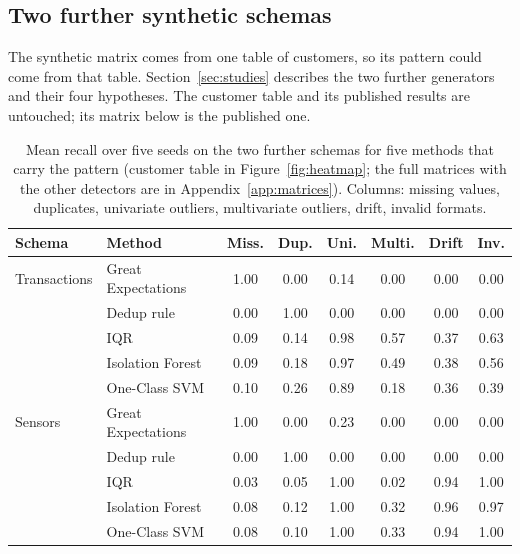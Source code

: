 \documentclass[conference]{IEEEtran}
\begin{document}
\subsection{Two further synthetic schemas}
\label{sec:schemas}
The synthetic matrix comes from one table of customers, so its pattern could
come from that table. Section~\ref{sec:studies} describes the two further generators and
their four hypotheses. The customer table and its published results are untouched; its
matrix below is the published one.

\begin{table}[t]
\caption{Mean recall over five seeds on the two further schemas for five
methods that carry the pattern (customer table in
Figure~\ref{fig:heatmap}; the full matrices with the other detectors are in
Appendix~\ref{app:matrices}). Columns: missing values, duplicates, univariate
outliers, multivariate outliers, drift, invalid formats.}
\label{tab:schemas}
\centering
\footnotesize
\setlength{\tabcolsep}{2.5pt}
\begin{tabular}{llcccccc}
\toprule
Schema & Method & Miss. & Dup. & Uni. & Multi. & Drift & Inv. \\
\midrule
Transactions & Great Expectations & 1.00 & 0.00 & 0.14 & 0.00 & 0.00 & 0.00 \\
             & Dedup rule         & 0.00 & 1.00 & 0.00 & 0.00 & 0.00 & 0.00 \\
             & IQR                & 0.09 & 0.14 & 0.98 & 0.57 & 0.37 & 0.63 \\
             & Isolation Forest   & 0.09 & 0.18 & 0.97 & 0.49 & 0.38 & 0.56 \\
             & One-Class SVM      & 0.10 & 0.26 & 0.89 & 0.18 & 0.36 & 0.39 \\
\midrule
Sensors      & Great Expectations & 1.00 & 0.00 & 0.23 & 0.00 & 0.00 & 0.00 \\
             & Dedup rule         & 0.00 & 1.00 & 0.00 & 0.00 & 0.00 & 0.00 \\
             & IQR                & 0.03 & 0.05 & 1.00 & 0.02 & 0.94 & 1.00 \\
             & Isolation Forest   & 0.08 & 0.12 & 1.00 & 0.32 & 0.96 & 0.97 \\
             & One-Class SVM      & 0.08 & 0.10 & 1.00 & 0.33 & 0.94 & 1.00 \\
\bottomrule
\end{tabular}
\end{table}
\end{document}
